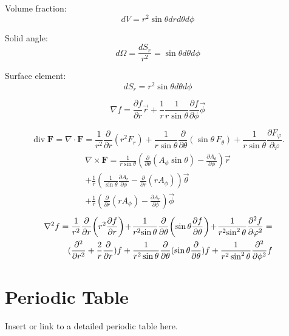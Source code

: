 \documentclass[12pt,a4paper]{article}
\begin{document}
	\vspace{.1in}
	Volume fraction: 
	\[ dV = r^2 \sin \theta dr d\theta d\phi \]
	
	\vspace{.1in}
	Solid angle: 
	\[ d\Omega = \frac{dS_r}{r^2} = \sin\theta d\theta d\phi \]
	
	\vspace{.1in}
	Surface element: 
	\[ dS_r = r^2 \sin\theta d\theta d\phi \]
		
		
\begin{equation}
	\nabla f = \frac{\partial f}{\partial r} \vec{r} + \frac{1}{r} \frac{1}{r \sin \theta} \frac{\partial f}{\partial \phi} \vec{\phi}
\end{equation}

\begin{equation}
	\operatorname {div} \mathbf {F} =\nabla \cdot \mathbf {F} ={\frac {1}{r^{2}}}{\frac {\partial }{\partial r}}\left(r^{2}F_{r}\right)+{\frac {1}{r\sin \theta }}{\frac {\partial }{\partial \theta }}(\sin \theta \,F_{\theta })+{\frac {1}{r\sin \theta }}{\frac {\partial F_{\varphi }}{\partial \varphi }}.
\end{equation}
\begin{equation}
	\begin{aligned}
		\nabla \times \mathbf{F} = \frac{1}{r\sin\theta} (\frac{\partial }{\partial \theta} (A_\phi \sin \theta ) - \frac{\partial A_\theta}{\partial \phi}) \vec{r} \\
		+ \frac{1}{r}(\frac{1}{\sin\theta }\frac{\partial A_r}{\partial \phi} - \frac{\partial}{\partial r }(rA_\phi)) \vec{\theta} \\
		+ \frac{1}{r} (\frac{\partial}{\partial r}(r A_\phi) - \frac{\partial A_r}{\partial \phi}) \vec{\phi}
	\end{aligned}
\end{equation}
\begin{equation}
	\begin{aligned}
		\nabla^2 f = {1 \over r^{2}}{\partial  \over \partial r}\!\left(r^{2}{\partial f \over \partial r}\right)\!+\!{1 \over r^{2}\!\sin \theta }{\partial  \over \partial \theta }\!\left(\sin \theta {\partial f \over \partial \theta }\right)\!+\!{1 \over r^{2}\!\sin ^{2}\theta }{\partial ^{2}f \over \partial \varphi ^{2}} = \\ (\frac{\partial^2}{\partial r^2} + \frac{2}{r} \frac{\partial}{\partial r}) f
		+ \frac{1}{r^2 \sin \theta }\frac{\partial}{\partial \theta} (\sin \theta \frac{\partial}{\partial \theta})f
		+ \frac{1}{r^2 \sin ^2 \theta } \frac{\partial ^2}{\partial \phi ^2 } f
	\end{aligned}
\end{equation}
	
	
	\section*{Periodic Table}
	Insert or link to a detailed periodic table here.
	
\end{document}
